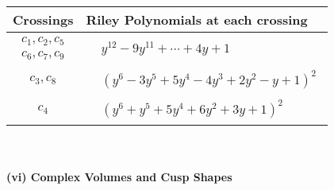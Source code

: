 \documentclass[1p]{elsarticle_modified}
\theoremstyle{definition}
\begin{document}
\begin{tabular}{m{50pt}|m{274pt}}
Crossings & \hspace{64pt}Riley Polynomials at each crossing \\
\hline $$\begin{aligned}c_{1},c_{2},c_{5}\\c_{6},c_{7},c_{9}\end{aligned}$$&$\begin{aligned}
&y^{12}-9 y^{11}+\cdots+4 y+1
\end{aligned}$\\
\hline $$\begin{aligned}c_{3},c_{8}\end{aligned}$$&$\begin{aligned}
&(y^6-3 y^5+5 y^4-4 y^3+2 y^2- y+1)^2
\end{aligned}$\\
\hline $$\begin{aligned}c_{4}\end{aligned}$$&$\begin{aligned}
&(y^6+y^5+5 y^4+6 y^2+3 y+1)^2
\end{aligned}$\\
\hline
\end{tabular}\\~\\
\newpage\flushleft \textbf{(vi) Complex Volumes and Cusp Shapes}
\end{document}
